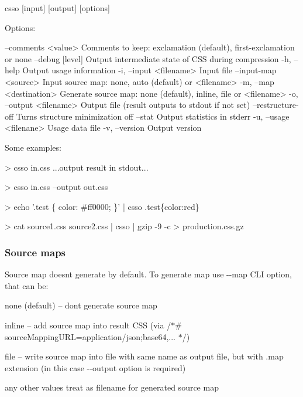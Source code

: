 \begin{DoxyCode}
csso [input] [output] [options]

Options:

      --comments <value>    Comments to keep: exclamation (default), first-exclamation or none
      --debug [level]       Output intermediate state of CSS during compression
  -h, --help                Output usage information
  -i, --input <filename>    Input file
      --input-map <source>  Input source map: none, auto (default) or <filename>
  -m, --map <destination>   Generate source map: none (default), inline, file or <filename>
  -o, --output <filename>   Output file (result outputs to stdout if not set)
      --restructure-off     Turns structure minimization off
      --stat                Output statistics in stderr
  -u, --usage <filenane>    Usage data file
  -v, --version             Output version
\end{DoxyCode}


Some examples\+:


\begin{DoxyCode}
> csso in.css
...output result in stdout...

> csso in.css --output out.css

> echo '.test \{ color: #ff0000; \}' | csso
.test\{color:red\}

> cat source1.css source2.css | csso | gzip -9 -c > production.css.gz
\end{DoxyCode}


\subsubsection*{Source maps}

Source map doesn\textquotesingle{}t generate by default. To generate map use {\ttfamily -\/-\/map} C\+LI option, that can be\+:


\begin{DoxyItemize}
\item {\ttfamily none} (default) – don\textquotesingle{}t generate source map
\item {\ttfamily inline} – add source map into result C\+SS (via {\ttfamily /$\ast$\# source\+Mapping\+U\+RL=application/json;base64,... $\ast$/})
\item {\ttfamily file} – write source map into file with same name as output file, but with {\ttfamily .map} extension (in this case {\ttfamily -\/-\/output} option is required)
\item any other values treat as filename for generated source map
\end{DoxyItemize}

